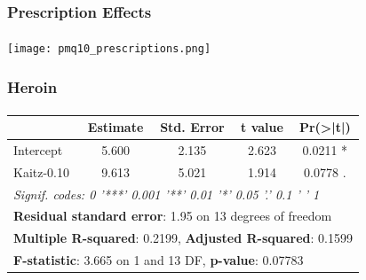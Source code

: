 \begin{frame}

    \label{presc_indeff}
    
    \frametitle{Prescription Effects} %
    \framesubtitle{}  %
    \rmfamily %

    \begin{center}
        \texttt{[image: pmq10\_prescriptions.png]}
    \end{center}
    
    \hyperlink{emp_rate_result}{}
    
\end{frame}


\begin{frame}[shrink=5]

    \label{table_heroin}
    
    \frametitle{Heroin} %
    \framesubtitle{}  %
    \rmfamily %

    \begin{table}[ht]
        \centering
        \begin{tabular}{lcccc}
        \toprule
         & \textbf{Estimate} & \textbf{Std. Error} & \textbf{t value} & \textbf{Pr(>|t|)} \\
        \midrule
        Intercept  & 5.600 & 2.135 & 2.623 & 0.0211 * \\
        Kaitz-0.10 & 9.613 & 5.021 & 1.914 & 0.0778 . \\
        \midrule
        \multicolumn{5}{l}{\textit{Signif. codes:  0 '***' 0.001 '**' 0.01 '*' 0.05 '.' 0.1 ' ' 1}} \\
        \midrule
        \multicolumn{5}{l}{\textbf{Residual standard error}: 1.95 on 13 degrees of freedom} \\
        \multicolumn{5}{l}{\textbf{Multiple R-squared}: 0.2199, \textbf{Adjusted R-squared}: 0.1599} \\
        \multicolumn{5}{l}{\textbf{F-statistic}: 3.665 on 1 and 13 DF, \textbf{p-value}: 0.07783} \\
        \bottomrule
        \end{tabular}
    \end{table}
    
    \hyperlink{heroin_result}{}
    
\end{frame}


